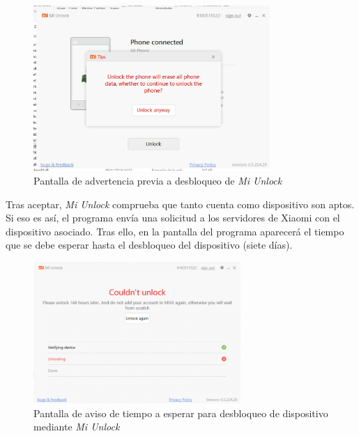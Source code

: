 \documentclass[12pt,a4paper,onecolumn,oneside]{report}
\begin{document}
\begin{figure}[H] 
\centering
  \includegraphics[width=0.8\textwidth]{figuras/root3.png}
  \caption[Pantalla de advertencia previa a desbloqueo de \textit{Mi Unlock}]{Pantalla de advertencia previa a desbloqueo de \textit{Mi Unlock}\\
  }
  \label{fig:root3}
\end{figure}

Tras aceptar, \textit{Mi Unlock} comprueba que tanto cuenta como dispositivo son aptos. Si eso es así, el programa envía una solicitud a los servidores de Xiaomi con el dispositivo asociado. Tras ello, en la pantalla del programa aparecerá el tiempo que se debe esperar hasta el desbloqueo del dispositivo (siete días).

\begin{figure}[H] 
\centering
  \includegraphics[width=0.7\textwidth]{figuras/root4.png}
  \caption[Pantalla de aviso de tiempo a esperar para desbloqueo de dispositivo mediante \textit{Mi Unlock}]{Pantalla de aviso de tiempo a esperar para desbloqueo de dispositivo mediante \textit{Mi Unlock}\\
  }
  \label{fig:root4}
\end{figure}
\end{document}
